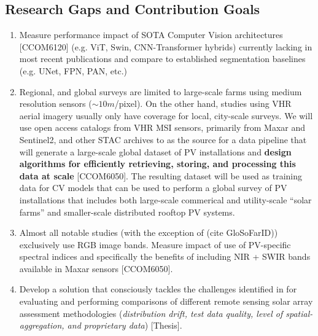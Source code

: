 \begin{multicols}{2}
\subsection{Research Gaps and Contribution Goals}
    \begin{enumerate}
        \item Measure performance impact of SOTA Computer Vision architectures [CCOM6120] (e.g. ViT, Swin, CNN-Transformer hybrids) currently lacking in most recent publications and compare to established segmentation baselines (e.g. UNet, FPN, PAN, etc.)
        \item Regional, and global surveys are limited to large-scale farms using medium resolution sensors ($\sim10m$/pixel). On the other hand, studies using VHR aerial imagery usually only have coverage for local, city-scale surveys. We will use open access catalogs from VHR MSI sensors, 
        primarily from Maxar and Sentinel2, and other STAC archives to as the source for a data pipeline that will generate a large-scale global dataset of PV installations and \textbf{design algorithms for efficiently retrieving, storing, and processing this data at scale} [CCOM6050]. 
        The resulting dataset will be used as training data for CV models that can be used to perform a global survey of PV installations that includes both large-scale commerical and utility-scale ``solar farms'' and smaller-scale distributed rooftop PV systems.
        \item Almost all notable studies (with the exception of (cite GloSoFarID)) exclusively use RGB image bands. Measure impact of use of PV-specific spectral indices\cite{He_universal_pv_spectral_index_2024} and specifically the benefits of including NIR + SWIR bands available in Maxar sensors [CCOM6050]. 
        \item Develop a solution that consciously tackles the challenges identified in \cite{Hu_solar_array_pitfalls_2022} for evaluating and performing comparisons of different remote sensing solar array assessment methodologies 
        (\textit{distribution drift, test data quality, level of spatial-aggregation, and proprietary data}) [Thesis].
    \end{enumerate}


\end{multicols}
